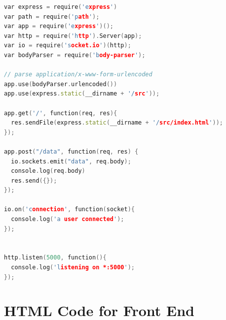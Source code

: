 \documentclass[conference]{IEEEtran}
\begin{document}
\begin{lstlisting}[language=C++, caption=Backend Server Code]
var express = require('express')
var path = require('path');
var app = require('express')();
var http = require('http').Server(app);
var io = require('socket.io')(http);
var bodyParser = require('body-parser');

// parse application/x-www-form-urlencoded
app.use(bodyParser.urlencoded())
app.use(express.static(__dirname + '/src'));

app.get('/', function(req, res){
  res.sendFile(express.static(__dirname + '/src/index.html'));
});

app.post("/data", function(req, res) {
  io.sockets.emit("data", req.body);
  console.log(req.body)
  res.send({});
});

io.on('connection', function(socket){
  console.log('a user connected');
});


http.listen(5000, function(){
  console.log('listening on *:5000');
});\end{lstlisting}

\section{HTML Code for Front End}
\end{document}
